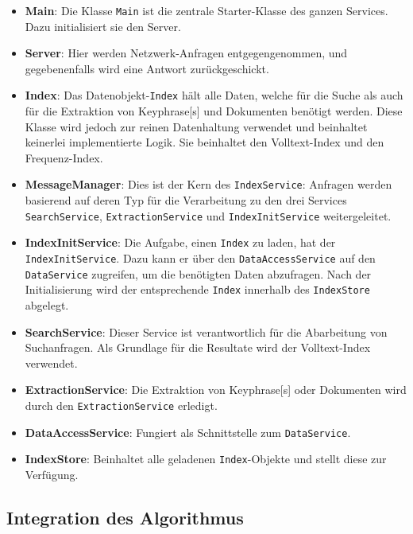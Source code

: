 \begin{itemize}
    \item \textbf{Main}: Die Klasse \texttt{Main} ist die zentrale Starter-Klasse des ganzen Services. Dazu initialisiert sie den Server. 
    \item \textbf{Server}: Hier werden Netzwerk-Anfragen entgegengenommen, und gegebenenfalls wird eine Antwort zu\-rück\-ge\-schi\-ckt.
    \item \textbf{Index}: Das Datenobjekt-\texttt{Index} hält alle Daten, welche für die Suche als auch für die Extraktion von \gls{Keyphrase}[s] und Dokumenten benötigt werden. Diese Klasse wird jedoch zur reinen Datenhaltung verwendet und beinhaltet keinerlei implementierte Logik. Sie beinhaltet den Volltext-Index und den Frequenz-Index. 
    \item \textbf{MessageManager}: Dies ist der Kern des \texttt{IndexService}: Anfragen werden basierend auf deren Typ für die Verarbeitung zu den drei Services \texttt{Search\-Ser\-vi\-ce}, \texttt{Ex\-trac\-tion\-Ser\-vi\-ce} und \texttt{In\-dex\-In\-it\-Ser\-vi\-ce} weitergeleitet.
    \item \textbf{IndexInitService}: Die Aufgabe, einen \texttt{Index} zu laden, hat der \texttt{IndexInitService}. Dazu kann er über den \texttt{DataAccessService} auf den \texttt{DataService} zugreifen, um die benötigten Daten abzufragen. Nach der Initialisierung wird der entsprechende \texttt{Index} innerhalb des \texttt{IndexStore} abgelegt.
    \item \textbf{SearchService}: Dieser Service ist verantwortlich für die Abarbeitung von Suchanfragen. Als Grundlage für die Resultate wird der Volltext-Index verwendet.  
    \item \textbf{ExtractionService}: Die Extraktion von \gls{Keyphrase}[s] oder Dokumenten wird durch den \texttt{ExtractionService} erledigt. 
    \item \textbf{DataAccessService}: Fungiert als Schnittstelle zum \texttt{DataService}.
    \item \textbf{IndexStore}: Beinhaltet alle geladenen \texttt{Index}-Objekte und stellt diese zur Verfügung. 
\end{itemize}



\subsection{Integration des Algorithmus}\label{impalgo}

